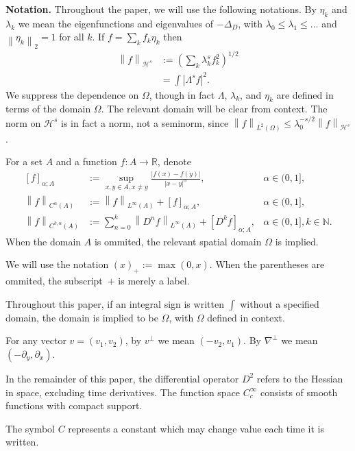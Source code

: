 \documentclass[11pt]{amsart}
\theoremstyle{remark}
\theoremstyle{definition}
\newcommand{\R}{\mathbb{R}}
\newcommand{\N}{\mathbb{N}}
\newcommand{\norm}[1]{\left\lVert#1\right\rVert}
\newcommand{\paren}[1]{\left( #1 \right)}
\newcommand{\bracket}[1]{\left[ #1 \right]}
\newcommand{\abs}[1]{\left\lvert #1 \right\rvert}
\newcommand{\del}{\partial}
\newcommand{\grad}{\nabla}
\newcommand{\Laplace}{\Delta}
\newcommand{\eigen}[1]{\eta_{#1}} %
\newcommand{\Ctest}{C_c^\infty}
\newcommand{\HD}{\mathcal{H}}
\newcommand{\HDint}[2]{\int \abs{\Lambda^{#1} #2}^2}
\begin{document}
\textbf{Notation.} Throughout the paper, we will use the following notations.
By $\eigen{k}$ and $\lambda_k$ we mean the eigenfunctions and eigenvalues of $-\Laplace_D$, with $\lambda_0 \leq \lambda_1 \leq \ldots$ and $\norm{\eigen{k}}_2 = 1$ for all $k$.  
If $f = \sum_k f_k \eigen{k}$ then
\begin{align*} 
\norm{f}_{\HD^s} &:= \paren{\sum_k \lambda_k^{s} f_k^2}^{1/2} 
\\ &= \HDint{s}{f}. 
\end{align*}
We suppress the dependence on $\Omega$, though in fact $\Lambda$, $\lambda_k$, and $\eigen{k}$ are defined in terms of the domain $\Omega$.  The relevant domain will be clear from context.  The norm on $\HD^s$ is in fact a norm, not a seminorm, since $\norm{f}_{L^2(\Omega)} \leq \lambda_0^{-s/2} \norm{f}_{\HD^s}$.  

For a set $A$ and a function $f:A \to \R$, denote
\begin{align*}
\bracket{f}_{\alpha;A} &:= \sup_{x,y \in A, x \neq y} \frac{|f(x)-f(y)|}{|x-y|^\alpha},  &\alpha \in (0,1], \\
\norm{f}_{C^\alpha(A)} &:= \norm{f}_{L^\infty(A)} + \bracket{f}_{\alpha;A}, & \alpha \in (0,1], \\
\norm{f}_{C^{k,\alpha}(A)} &:= \sum_{n=0}^k \norm{D^n f}_{L^\infty(A)} + \bracket{D^k f}_{\alpha;A}, & \alpha \in (0,1], k \in \N.
\end{align*}
When the domain $A$ is ommited, the relevant spatial domain $\Omega$ is implied.  

We will use the notation $(x)_+ := \max(0,x)$.  When the parentheses are ommited, the subscript~$+$ is merely a label.  

Throughout this paper, if an integral sign is written $\int$ without a specified domain, the domain is implied to be $\Omega$, with $\Omega$ defined in context.  

For any vector $v = (v_1,v_2)$, by $v^\perp$ we mean $(-v_2,v_1)$. By $\grad^\perp$ we mean $(-\del_y, \del_x)$.  

In the remainder of this paper, the differential operator $D^2$ refers to the Hessian in space, excluding time derivatives.  The function space $\Ctest$ consists of smooth functions with compact support.  


The symbol $C$ represents a constant which may change value each time it is written.  
\end{document}
